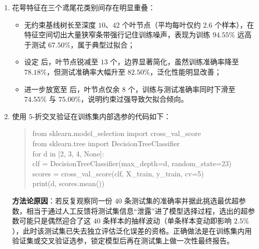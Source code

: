 \begin{exercise}[title={Iris 决策树过拟合分析与模型选择规范},level=advanced,points=18,tags={决策树,过拟合,预剪枝,交叉验证}]
\begin{solution}
\begin{enumerate}
  \item 花萼特征在三个鸢尾花类别间存在明显重叠：
  \begin{itemize}
    \item 无约束基线树长至深度 $10$、$42$ 个叶节点（平均每叶仅约 $2.6$ 个样本），在特征空间切出大量狭窄条带强行记住训练噪声，表现为训练 $94.55\%$ 远高于测试 $67.50\%$，属于典型过拟合；
    \item 设定  后，叶节点锐减至 $13$ 个，边界显著简化，虽然训练准确率降至 $78.18\%$，但测试准确率大幅升至 $82.50\%$，泛化性能明显改善；
    \item 进一步放宽至  后，叶节点仅余 $8$ 个，训练与测试准确率同时下滑至 $74.55\%$ 与 $75.00\%$，说明约束过强导致欠拟合倾向。
  \end{itemize}
  \item 使用 $5$-折交叉验证在训练集内部选参的代码如下：
  \begin{quote}\ttfamily\small
    from sklearn.model\_selection import cross\_val\_score\\
    from sklearn.tree import DecisionTreeClassifier\\
    for d in [2, 3, 4, None]:\\
    \hspace*{2em}clf = DecisionTreeClassifier(max\_depth=d, random\_state=23)\\
    \hspace*{2em}scores = cross\_val\_score(clf, X\_train, y\_train, cv=5)\\
    \hspace*{2em}print(d, scores.mean())
  \end{quote}
  \textbf{方法论原因}：若反复观察同一份 $40$ 条测试集的准确率并据此挑选最优超参数，相当于通过人工反馈将测试集信息“泄露”进了模型选择过程，选出的超参数可能只是偶然迎合了这 $40$ 条样本的抽样波动（单条样本变动即影响 $2.5\%$），此时该测试集已失去独立评估泛化误差的资格。正确做法是在训练集内用验证集或交叉验证选参，锁定模型后再在测试集上做一次性最终报告。
\end{enumerate}
\end{solution}
\end{exercise}
